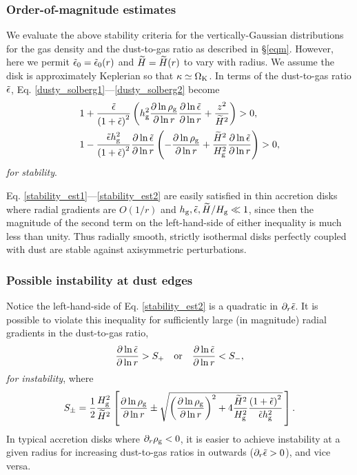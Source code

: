 \subsubsection{Order-of-magnitude estimates} 
We evaluate the above stability criteria for the vertically-Gaussian
distributions for the gas density and the dust-to-gas ratio as 
described in \S\ref{eqm}. However, here we permit 
$\tilde{\epsilon}_0=\tilde{\epsilon}_0(r)$ and $\widetilde{H}=\widetilde{H}(r)$ to vary with
radius. We assume the disk is approximately Keplerian so that
$\kappa\simeq\Omega_{\rm K}$. In terms of the dust-to-gas
ratio $\tilde{\epsilon}$, Eq. \ref{dusty_solberg1}---\ref{dusty_solberg2}
become   
\begin{align}
  &1 + \frac{\tilde{\epsilon}}{\left(1+
    \tilde{\epsilon}\right)^2}\left(h_\mathrm{g}^2\frac{\partial\ln{\rho_\mathrm{g}}}{\partial\ln{r}}
  \frac{\partial\ln{\tilde{\epsilon}}}{\partial\ln{r}} + 
  \frac{z^2}{\widetilde{H}^2}\right)>0 \label{stability_est1},   \\ 
&1 - \frac{\tilde{\epsilon}
  h_\mathrm{g}^2}{\left(1+\tilde{\epsilon}\right)^2}
  \frac{\partial\ln{\tilde{\epsilon}}}{\partial\ln{r}}\left(-\frac{\partial\ln{\rho_\mathrm{g}}}{\partial\ln{r}}+\frac{\widetilde{H}^2}{H_\mathrm{g}^2}\frac{\partial\ln{\tilde{\epsilon}}}{\partial\ln{r}}\right)
  > 0 \label{stability_est2},
\end{align}
\emph{for stability}. 

Eq. \ref{stability_est1}---\ref{stability_est2} are easily satisfied
in thin accretion disks where radial gradients are $O(1/r)$ and
$h_\mathrm{g},\tilde{\epsilon}, \widetilde{H}/H_\mathrm{g}\ll 1$, since then the
magnitude of the second term on the left-hand-side  of either
inequality is much less than unity. Thus radially smooth, strictly
isothermal disks perfectly coupled with dust are stable against
axisymmetric perturbations. 


\subsubsection{Possible instability at dust edges}
Notice the left-hand-side of Eq. \ref{stability_est2} is a quadratic in
$\partial_r\tilde{\epsilon}$. It is possible to
violate this inequality for sufficiently large (in magnitude) radial
gradients  in the dust-to-gas ratio, 
\begin{align}
  \frac{\partial\ln{\tilde{\epsilon}}}{\partial\ln{r}} > S_+ \quad \mathrm{or} \quad 
  \frac{\partial\ln{\tilde{\epsilon}}}{\partial\ln{r}} < S_-,
\end{align}
\emph{for instability}, where
\begin{align}\label{spm}
S_\pm = \frac{1}{2}\frac{H_\mathrm{g}^2}{\widetilde{H}^2} 
  \left[
  \frac{\partial\ln{\rho_\mathrm{g}}}{\partial\ln{r}} \pm 
  \sqrt{
  \left(\frac{\partial\ln{\rho_\mathrm{g}}}{\partial\ln{r}}\right)^2 + 
  4 \frac{\widetilde{H}^2}{H_\mathrm{g}^2}
  \frac{\left(1+\tilde{\epsilon}\right)^2}{\tilde{\epsilon} h_\mathrm{g}^2}
  }
  \,\right]. 
\end{align} 
In typical accretion disks where $\partial_r\rho_\mathrm{g}<0$, it is easier to
achieve instability at a given radius for increasing dust-to-gas
ratios in outwards ($\partial_r\tilde{\epsilon} > 0$), and vice versa.  

